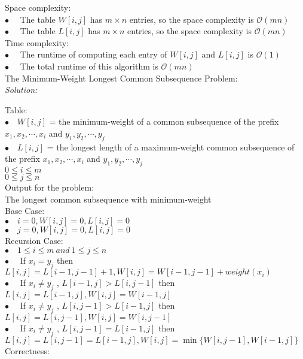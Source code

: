 \documentclass[12pt,letterpaper]{article}
\newcommand{\solution}{\textit{Solution:}\par}
\begin{document}
Space complexity: \\
$\bullet \quad$ The table $W[i,j]$ has $m \times n$ entries, so the space complexity is $\mathcal{O}(mn)$ \\
$\bullet \quad$ The table $L[i,j]$ has $m \times n$ entries, so the space complexity is $\mathcal{O}(mn)$ \\
Time complexity: \\
$\bullet \quad$ The runtime of computing each entry of $W[i,j]$ and $L[i,j]$ is $\mathcal{O}(1)$ \\
$\bullet \quad$ The total runtime of this algorithm is $\mathcal{O}(mn)$ \\

The Minimum-Weight Longest Common Subsequence Problem: \\
\solution
Table: \\
$\bullet \quad W[i,j]$ = the minimum-weight of a common subsequence of the prefix $x_1,x_2,\cdots,x_i$ and $y_1,y_2,\cdots,y_j$ \\
$\bullet \quad L[i,j]$ = the longest length of a maximum-weight common subsequence of the prefix $x_1,x_2,\cdots,x_i$ and $y_1,y_2,\cdots,y_j$ \\
$ 0 \le i \le m $ \\
$ 0 \le j \le n $ \\
Output for the problem: \\
The longest common subsequence with minimum-weight \\
Base Case: \\
$\bullet \quad i = 0, W[i,j] = 0, L[i,j] = 0$ \\
$\bullet \quad j = 0, W[i,j] = 0, L[i,j] = 0$ \\
Recursion Case: \\
$\bullet \quad 1 \le i \le m\  and\ 1 \le j \le n$ \\
$\bullet \quad $ If $x_i = y_j $ then $ L[i,j] = L[i-1,j-1] + 1 , W[i,j] = W[i-1,j-1] + weight(x_i)$ \\
$\bullet \quad $ If $x_i \neq y_j $ , $L[i-1,j] > L[i,j-1] $ then $L[i,j] = L[i-1,j], W[i,j] = W[i-1,j]$ \\
$\bullet \quad $ If $x_i \neq y_j $ , $L[i,j-1] > L[i-1,j] $ then $L[i,j] = L[i,j-1], W[i,j] = W[i,j-1]$ \\
$\bullet \quad $ If $x_i \neq y_j $ , $L[i,j-1] = L[i-1,j] $ then $L[i,j] = L[i,j-1] = L[i-1,j], W[i,j] = \min \{ W[i,j-1], W[i-1,j] \}$ \\
Correctness: \\
\end{document}
